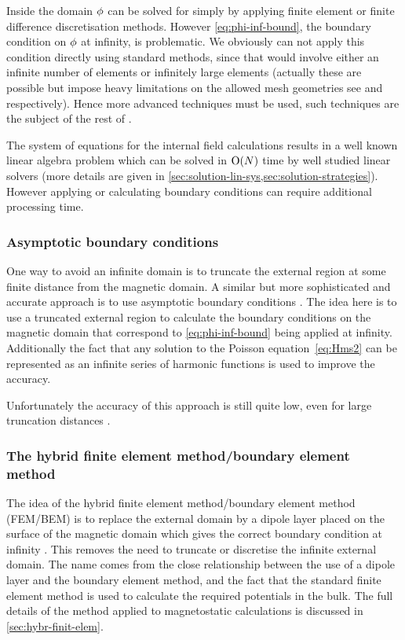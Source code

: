 Inside the domain $\phi$ can be solved for simply by applying finite element or finite difference discretisation methods.
However \cref{eq:phi-inf-bound}, the boundary condition on $\phi$ at infinity, is problematic.
We obviously can not apply this condition directly using standard methods, since that would involve either an infinite number of elements or infinitely large elements (actually these are  possible but impose heavy limitations on the allowed mesh geometries see \eg \cite{Alouges2001} and \cite{Fidler2000} respectively).
Hence more advanced techniques must be used, such techniques are the subject of the rest of .

The system of equations for the internal field calculations results in a well known linear algebra problem which can be solved in $\mathrm{O}{\left( N \right)}$ time by well studied linear solvers (more details are given in \cref{sec:solution-lin-sys,sec:solution-strategies}).
However applying or calculating boundary conditions can require additional processing time.



\subsubsection{Asymptotic boundary conditions}
\label{sec:asymptot-bcs}

One way to avoid an infinite domain is to truncate the external region at some finite distance from the magnetic domain.
A similar but more sophisticated and accurate approach is to use asymptotic boundary conditions \cite{Yang1997}.
The idea here is to use a truncated external region to calculate the boundary conditions on the magnetic domain that correspond to \cref{eq:phi-inf-bound} being applied at infinity.
Additionally the fact that any solution to the Poisson equation~\cref{eq:Hms2} can be represented as an infinite series of harmonic functions is used to improve the accuracy.

Unfortunately the accuracy of this approach is still quite low, even for large truncation distances \cite{Bottauscio2008}.


\subsubsection{The hybrid finite element method/boundary element method}
\label{sec:bound-elem-meth}

The idea of the hybrid finite element method/boundary element method (FEM/BEM) is to replace the external domain by a dipole layer placed on the surface of the magnetic domain which gives the correct boundary condition at infinity \cite{Fredkin1990}.
This removes the need to truncate or discretise the infinite external domain.
The name comes from the close relationship between the use of a dipole layer and the boundary element method, and the fact that the standard finite element method is used to calculate the required potentials in the bulk.
The full details of the method applied to magnetostatic calculations is discussed in \cref{sec:hybr-finit-elem}.

